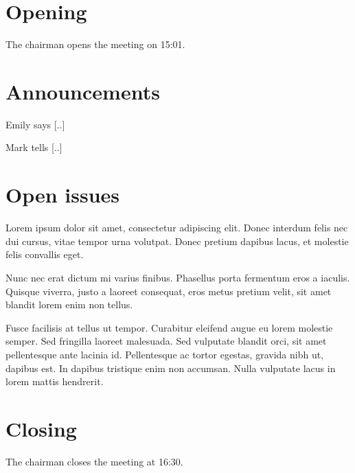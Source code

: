 \documentclass[a4paper]{sticky_minutes}
\date{2015-02-17}
\begin{document}
\header

\section{Opening}

The chairman opens the meeting on 15:01.

\section{Announcements}

Emily says [..]

Mark tells [..]

\section{Open issues}

Lorem ipsum dolor sit amet, consectetur adipiscing elit. Donec interdum felis nec dui
cursus, vitae tempor urna volutpat. Donec pretium dapibus lacus, et molestie felis
convallis eget.


Nunc nec erat dictum mi varius finibus. Phasellus porta fermentum eros
a iaculis. Quisque viverra, justo a laoreet consequat, eros metus pretium velit, sit
amet blandit lorem enim non tellus.


Fusce facilisis at tellus ut tempor. Curabitur eleifend augue eu lorem molestie
semper. Sed fringilla laoreet malesuada. Sed vulputate blandit orci, sit amet
pellentesque ante lacinia id. Pellentesque ac tortor egestas, gravida nibh ut,
dapibus est. In dapibus tristique enim non accumsan. Nulla vulputate lacus in lorem
mattis hendrerit.


\section{Closing}

The chairman closes the meeting at 16:30.

\appendix
\actionlist
\end{document}
